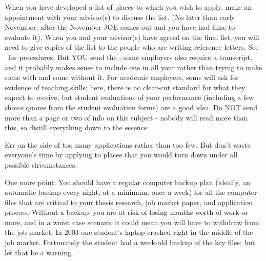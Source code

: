 \documentclass{econtex}
\begin{document}
When you have developed a list of places to which you wish to apply,
make an appointment with your advisor(s) to discuss the list.  (No
later than early November, after the November JOE comes out and you
have had time to evaluate it).  When you and your advisor(s) have
agreed on the final list, you will need to give copies of
the list to the people who are writing reference letters.  See \recLet~for procedures.  But YOU send the {\Acorn}; some employers also require a
transcript, and it probably makes sense to include one in all your
{\Acorns} rather than trying to make some {\Acorns} with and some without
it.  For academic employers, some will ask for evidence of teaching
skills; here, there is no clear-cut standard for what they expect to
receive, but student evaluations of your performance (including a few
choice quotes from the student evaluation forms) are a good idea.  Do
NOT send more than a page or two of info on this subject - nobody will
read more than this, so distill everything down to the essence.

Err on the side of too many applications rather than too few.  But
don't waste everyone's time by applying to places that you would turn
down under all possible circumstances.
  
One more point: You should have a regular computer backup plan
(ideally, an automatic backup every night; at a minimum, once a week)
for all the computer files that are critical to your thesis research,
job market paper, and application process.  Without a backup, you are
at risk of losing months worth of work or more, and in a worst case
scenario it could mean you will have to withdraw from the job market.
In 2003 one student's laptop crashed right in the middle of the job
market.  Fortunately the student had a week-old backup of the key
files; but let that be a warning.

\pagebreak
\end{document}
